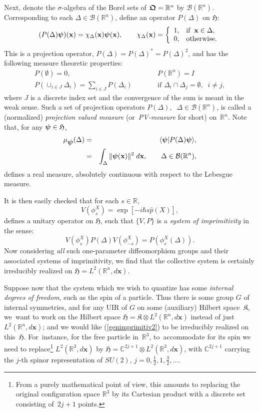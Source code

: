 \documentclass[12pt]{amsart}
\numberwithin{equation}{section}
\theoremstyle{remark}
\newcommand\HH{\mathfrak H}
\newcommand\RR{\mathbb R}
\newcommand{\be}{\begin{equation}}
\newcommand{\en}{\end{equation}}
\newcommand{\bea}{\begin{eqnarray}}
\newcommand{\ena}{\end{eqnarray}}
\newcommand{\CC}{\C}
\newcommand{\bpsi}{\mbox{\boldmath $\psi$}}
\newcommand{\bfrakQ}{\mbox{\boldmath $\mathfrak Q$}}
\newcommand{\bx}{\mathbf x}
\newcommand{\C}{\mathbb C}
\begin{document}
Next, denote the $\sigma$-algebra of the Borel sets of
$\bfrakQ = {\mathbb R}^n$ by ${\mathcal B}({\mathbb R}^n)$. Corresponding
to each $\Delta \in {\mathcal B}({\mathbb R}^n)$, define an operator
$P(\Delta )$ on $\HH$:
\be
  (P(\Delta )\bpsi )(\bx ) = \chi_{\Delta} (\bx )\bpsi (\bx ), \qquad
  \chi_{\Delta} (\bx ) = \left\{ \begin{array}{ll} 1, & \mbox{\rm if} \;\;
  \bx \in \Delta,\\
  0, & \mbox{\rm otherwise.}    \end{array}\right.
\label{PVmeas1}
\en
This is a projection operator, $P(\Delta ) =  P(\Delta )^{*} = P(\Delta )^{2}$,
and has the following measure theoretic properties:
\bea
   P(\emptyset ) = 0 , & \quad & P({\mathbb R}^n) = I \nonumber \\
   P(\cup_{i\in J}\Delta_{i}) = \sum_{i\in J}P(\Delta_{i}) & \qquad &
   \text{if } \Delta_{i}\cap\Delta_{j} = \emptyset, \;\; i\neq j,
\label{PVmeas2}
\ena
where $J$ is a discrete index set and the convergence of the sum is meant in
the weak sense. Such a set of projection operators $P(\Delta ), \;\; \Delta \in
{\mathcal B}({\mathbb R}^n)$, is called a (normalized) {\em projection valued
measure} (or~{\em PV-measure} for short) on~$\RR^n$. Note that, for any
$\bpsi \in \HH$,
\bea
  \mu_{\bpsi}(\Delta) & = & \langle\bpsi\vert P(\Delta )\bpsi\rangle ,
       \nonumber\\
                      & = & \int_{\Delta}\Vert\bpsi (\bx )\Vert^{2}\;d\bx ,
       \qquad  \Delta \in {\mathcal B}({\mathbb R}^n),
\label{realmeas1}
\ena
defines a real measure, absolutely continuous with respect to the Lebesgue
measure.

It is then easily checked that for each $s \in \mathbb R$,
\be
   V(\phi_{s}^{X}) = \exp [-i\hbar s\widehat{p}(X)],
\label{genimprimitiv1}
\en
defines a unitary operator on $\HH$, such that $\{V,P\}$ is a {\em system of
imprimitivity} in the sense:
\be
     V(\phi_{s}^{X})P(\Delta )V(\phi_{-s}^{X})  = P( \phi_{s}^{X}(\Delta )).
\label{genimprimitiv2}
\en
Now considering {\em all} such one-parameter diffeomorphism groups and their
associated systems of imprimitivity, we find that the collective system is
certainly irreducibly realized on $\HH= L^{2}({\mathbb R}^n, d\bx )$.

Suppose now that the system which we wish to quantize has some {\em internal
degrees of freedom}, such as the spin of a particle. Thus there is some group
$G$ of internal symmetries, and for any UIR of $G$ on some (auxiliary) Hilbert
space~$\mathfrak K$, we~want to work on the Hilbert space $\HH=\mathfrak K
\otimes L^2(\RR^n,d\bx)$ instead of just $L^2(\RR^n,d\bx)$; and we would like
(\ref{genimprimitiv2}) to be irreducibly realized on this~$\HH$. For~instance,
for the free particle in~$\RR^3$, to~accommodate for its spin we need to
replace\footnote{From a purely mathematical point of view, this amounts to
replacing the original configuration space $\RR^3$ by its Cartesian product
with a discrete set consisting of~$2j+1$ points.} $L^2(\RR^3,d\bx)$ by
$\HH=\CC^{2j+1}\otimes L^2(\RR^3,d\bx)$, with $\CC^{2j+1}$ carrying the $j$-th
spinor representation of $SU(2)$, $j=0,\frac12,1,\frac32,\dots$.
\end{document}

